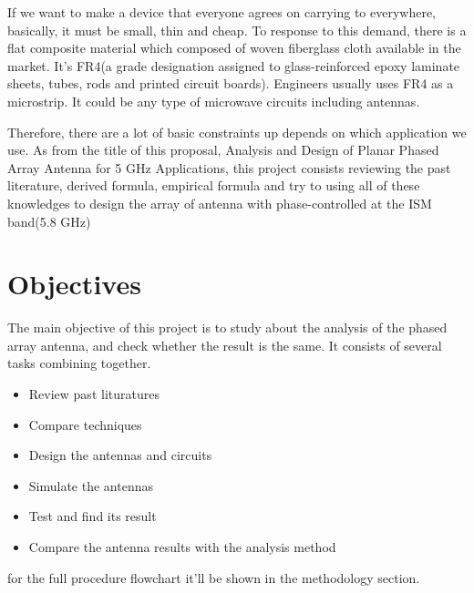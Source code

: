 \documentclass[11pt,a4paper]{article}
\begin{document}
    \indent If we want to make a device that everyone agrees on carrying to everywhere, basically, it must be small, thin and cheap.
            To response to this demand, there is a flat composite material which composed of woven fiberglass cloth available in the market.
            It's FR4(a grade designation assigned to glass-reinforced epoxy laminate sheets, tubes, rods and printed circuit boards).
            Engineers usually uses FR4 as a microstrip. It could be any type of microwave circuits including antennas.
    
    \indent Therefore, there are a lot of basic constraints up depends on which application we use. As from the title of this proposal,
            Analysis and Design of Planar Phased Array Antenna for 5 GHz Applications, this project consists reviewing the
            past literature, derived formula, empirical formula and try to using all of these knowledges to design the array of antenna with
            phase-controlled at the ISM band(5.8 GHz)
  
  \newpage

  \section{Objectives}
    \indent The main objective of this project is to study about the analysis of the phased array antenna, and check whether the result is the
            same. It consists of several tasks combining together.
    \begin{itemize}
      \item Review past lituratures
      \item Compare techniques
      \item Design the antennas and circuits
      \item Simulate the antennas
      \item Test and find its result
      \item Compare the antenna results with the analysis method
    \end{itemize}
    \indent for the full procedure flowchart it'll be shown in the methodology section.
   
  \newpage
  
\end{document}
